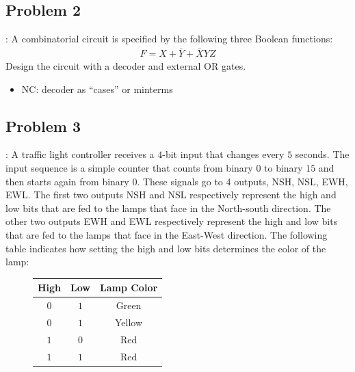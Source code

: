 \documentclass{../slides}
\begin{document}
\subsection{Problem 2}
\begin{frame}{\secname: \subsecname}
    A combinatorial circuit is specified by the following three Boolean functions:
    \begin{gather*}
        F = X + \overbar{Y} + \overbar{X}YZ
    \end{gather*}
    Design the circuit with a decoder and external OR gates.
    \begin{itemize}
        \item NC: decoder as \enquote{cases} or minterms
    \end{itemize}
\end{frame}

\subsection{Problem 3}
\begin{frame}{\secname: \subsecname}
    A traffic light controller receives a $4$-bit input that changes every $5$ seconds. The input sequence is a simple counter that counts from binary $0$ to binary $15$ and then starts again from binary $0$. These signals go to $4$ outputs, NSH, NSL, EWH, EWL. The first two outputs NSH and NSL respectively represent the high and low bits that are fed to the lamps that face in the North-south direction. The other two outputs EWH and EWL respectively represent the high and low bits that are fed to the lamps that face in the East-West direction. The following table indicates how setting the high and low bits determines the color of the lamp:
    \begin{figure}[H]
        \centering
        \begin{tabular}{cc|c}
            High & Low & Lamp Color \\ \hline 
            $0$ & $1$ & Green \\
            $0$ & $1$ & Yellow \\
            $1$ & $0$ & Red \\
            $1$ & $1$ & Red
        \end{tabular}
    \end{figure}
\end{frame}
\end{document}
